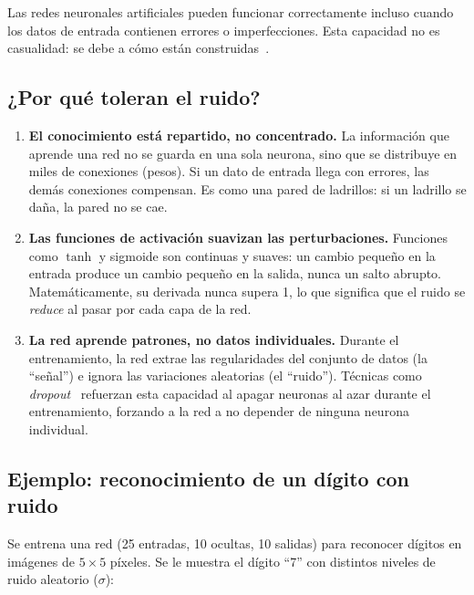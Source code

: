 
Las redes neuronales artificiales pueden funcionar correctamente incluso cuando los datos de entrada contienen errores o imperfecciones. Esta capacidad no es casualidad: se debe a cómo están construidas~\cite{haykin2009neural}.

\subsection{¿Por qué toleran el ruido?}

\begin{enumerate}[label=\arabic*.]
    \item \textbf{El conocimiento está repartido, no concentrado.} La información que aprende una red no se guarda en una sola neurona, sino que se distribuye en miles de conexiones (pesos). Si un dato de entrada llega con errores, las demás conexiones compensan. Es como una pared de ladrillos: si un ladrillo se daña, la pared no se cae.

    \item \textbf{Las funciones de activación suavizan las perturbaciones.} Funciones como $\tanh$ y sigmoide son continuas y suaves: un cambio pequeño en la entrada produce un cambio pequeño en la salida, nunca un salto abrupto. Matemáticamente, su derivada nunca supera 1, lo que significa que el ruido se \emph{reduce} al pasar por cada capa de la red.

    \item \textbf{La red aprende patrones, no datos individuales.} Durante el entrenamiento, la red extrae las regularidades del conjunto de datos (la ``señal'') e ignora las variaciones aleatorias (el ``ruido''). Técnicas como \emph{dropout}~\cite{srivastava2014dropout} refuerzan esta capacidad al apagar neuronas al azar durante el entrenamiento, forzando a la red a no depender de ninguna neurona individual.
\end{enumerate}

\subsection{Ejemplo: reconocimiento de un dígito con ruido}

Se entrena una red (25 entradas, 10 ocultas, 10 salidas) para reconocer dígitos en imágenes de $5 \times 5$ píxeles. Se le muestra el dígito ``7'' con distintos niveles de ruido aleatorio ($\sigma$):

